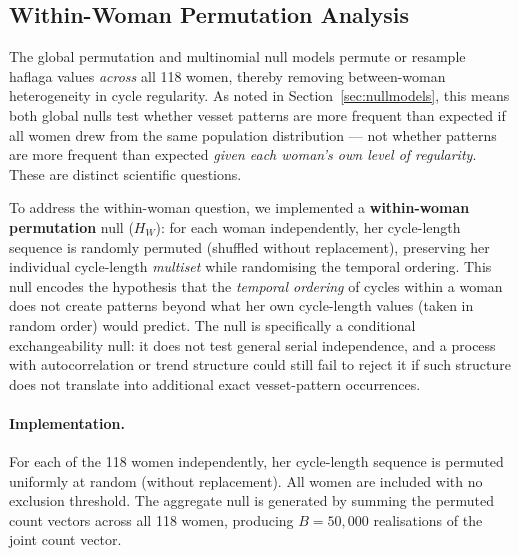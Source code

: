 \documentclass[12pt]{article}
\begin{document}
\subsection{Within-Woman Permutation Analysis}
\label{sec:stratified}

The global permutation and multinomial null models permute or resample haflaga values
\emph{across} all 118 women, thereby removing between-woman heterogeneity in cycle
regularity. As noted in Section~\ref{sec:nullmodels}, this means both global nulls
test whether vesset patterns are more frequent than expected if all women drew from
the same population distribution --- not whether patterns are more frequent than
expected \emph{given each woman's own level of regularity}. These are distinct
scientific questions.

To address the within-woman question, we implemented a \textbf{within-woman permutation} null ($H_W$): for each woman independently, her cycle-length sequence is randomly permuted (shuffled without replacement), preserving her individual cycle-length \emph{multiset} while randomising the temporal ordering. This null encodes the hypothesis that the
\emph{temporal ordering} of cycles within a woman does not create patterns beyond what her
own cycle-length values (taken in random order) would predict. The null is specifically
a conditional exchangeability null: it does not test general serial independence, and a
process with autocorrelation or trend structure could still fail to reject it if such
structure does not translate into additional exact vesset-pattern occurrences.

\paragraph{Implementation.}
For each of the 118 women independently, her cycle-length sequence is permuted uniformly at random (without replacement). All women are included with no exclusion threshold. The aggregate null is generated by summing the permuted count vectors across all 118 women, producing $B = 50{,}000$ realisations of the joint count vector.
\end{document}
